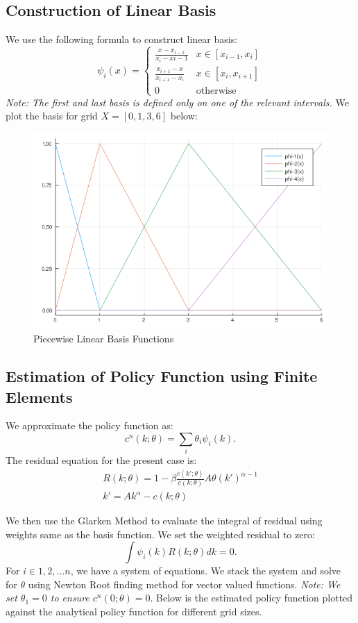 \documentclass[12pt]{article}
\begin{document}
\subsection{Construction of Linear Basis}
We use the following formula to construct linear basis:
$$\psi_i(x) = 
\begin{cases}
\frac{x - x_{i-1}}{x_i - x{i-1}} & x \in [x_{i-1}, x_i] \\
\frac{x_{i+1} - x}{x_{i+1} - x_i} & x \in [x_i, x_{i+1}] \\
0 & \text{otherwise}
\end{cases}
$$
\textit{Note: The first and last basis is defined only on one of the relevant intervals.} We plot the basis for grid $X = [0,1, 3, 6]$ below: 
\begin{figure}[h]
\centering
\includegraphics[scale=0.5]{linear_basisMM.png}
\caption{Piecewise Linear Basis Functions}
\end{figure}

\subsection{Estimation of Policy Function using Finite Elements}
We approximate the policy function as: $$c^n(k; \theta) = \sum_i \theta_i \psi_i(k).$$
The residual equation for the present case is: 
\begin{gather*}
R(k; \theta) = 1 - \beta \frac{c(k'; \theta)}{c(k; \theta)} A \theta (k')^{\alpha-1}\\
k' = Ak^\alpha - c(k; \theta)
\end{gather*}

We then use the Glarken Method to evaluate the integral of residual using weights same as the basis function. We set the weighted residual to zero: $$\int \psi_i(k)R(k; \theta)dk = 0.$$ For $i \in 1, 2, \dots n$, we have a system of equations. We stack the system and solve for $\theta$ using Newton Root finding method for vector valued functions. \textit{Note: We set $\theta_1=0$ to ensure $c^n(0; \theta) =0.$} Below is the estimated policy function plotted against the analytical policy function for different grid sizes.
\end{document}
